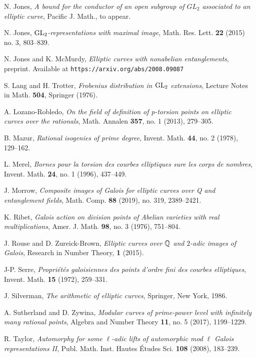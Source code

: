 \begin{thebibliography}{99}
 N. Jones, \emph{A bound for the conductor of an open subgroup of $GL_2$ associated to an elliptic curve}, Pacific J. Math., to appear.

 N. Jones, \emph{$\operatorname{GL}_2$-representations with maximal image}, Math. Res. Lett. \textbf{22} (2015) no. 3, 803--839.

 N. Jones and K. McMurdy, \emph{Elliptic curves with nonabelian entanglements}, preprint.  Available at {\tt{https://arxiv.org/abs/2008.09087}}

 S. Lang and H. Trotter, \emph{Frobenius distribution in $\operatorname{GL}_2$ extensions}, 
Lecture Notes in Math. \textbf{504}, Springer (1976). 

 A. Lozano-Robledo,  \emph{On the field of definition of p-torsion points on elliptic curves over the rationals}, Math. Annalen \textbf{357}, no. 1 (2013), 279--305.

 B. Mazur, \emph{Rational isogenies of prime degree}, Invent. Math. \textbf{44}, no. 2 (1978), 129--162.

 L. Merel, \emph{Bornes pour la torsion des courbes elliptiques sure les corps de nombres}, Invent. Math. \textbf{24}, no. 1 (1996), 437--449.

 J. Morrow, \emph{Composite images of Galois for elliptic curves over Q and entanglement fields}, Math. Comp.
\textbf{88} (2019), no. 319, 2389--2421.

 K. Ribet, \emph{Galois action on division points of Abelian varieties with real multiplications}, Amer. J. Math. \textbf{98}, no. 3 (1976), 751--804.

 J. Rouse and D. Zureick-Brown, \emph{Elliptic curves over $\mathbb{Q}$ and $2$-adic images of Galois}, Research in Number Theory, \textbf{1} (2015).

 J-P. Serre,  \emph{Propri\'{e}t\'{e}s galoisiennes des points d'ordre fini des courbes elliptiques}, Invent. Math. \textbf{15} (1972), 259--331.

 J. Silverman, \emph{The arithmetic of elliptic curves}, Springer, New York, 1986.

 A. Sutherland and D. Zywina, \emph{Modular curves of prime-power level with infinitely many rational points}, Algebra and Number Theory \textbf{11}, no. 5 (2017), 1199--1229.

 R. Taylor, \emph{Automorphy for some $\ell$-adic lifts of automorphic mod $\ell$ Galois representations II}, Publ. Math. Inst. Hautes \'{E}tudes Sci. \textbf{108} (2008), 183--239.


\end{thebibliography}
